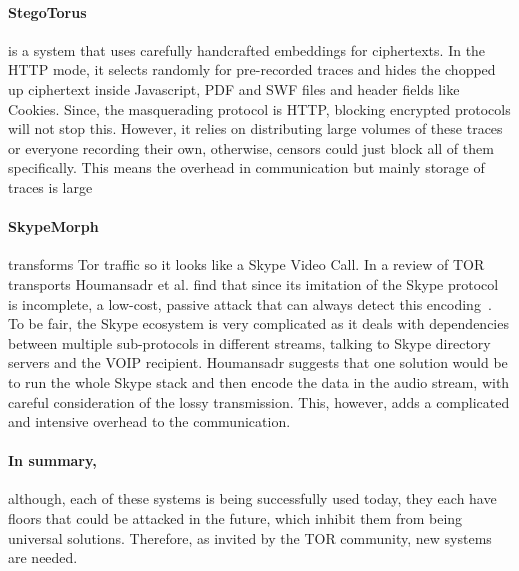 \documentclass[ %
                    author={Samuel Russell},
                supervisor={Prof. Bogdan Warinschi},
                    degree={MEng},
                     title={Innocuous Ciphertexts},
                  subtitle={The DE-CENSOR Scheme},
                      type={Research},
                      year={2018} ]{dissertation}
\begin{document}
\paragraph{StegoTorus} is a system that uses carefully handcrafted embeddings for ciphertexts. In the HTTP mode, it selects randomly for pre-recorded traces and hides the chopped up ciphertext inside Javascript, PDF and SWF files and header fields like Cookies. Since, the masquerading protocol is HTTP, blocking encrypted protocols will not stop this. However, it relies on distributing large volumes of these traces or everyone recording their own, otherwise, censors could just block all of them specifically. This means the overhead in communication but mainly storage of traces is large

\paragraph{SkypeMorph} transforms Tor traffic so it looks like a Skype Video Call.
In a review of TOR transports Houmansadr et al. find that since its imitation of the Skype protocol is incomplete, a low-cost, passive attack that can always detect this encoding~\cite{parot}.
To be fair, the Skype ecosystem is very complicated as it deals with dependencies between multiple sub-protocols in different streams, talking to Skype directory servers and the VOIP recipient. Houmansadr suggests that one solution would be to run the whole Skype stack and then encode the data in the audio stream, with careful consideration of the lossy transmission. This, however, adds a complicated and intensive overhead to the communication.

\paragraph{In summary,} although, each of these systems is being successfully used today, they each have floors that could be attacked in the future, which inhibit them from being universal solutions. Therefore, as invited by the TOR community, new systems are needed.

%
%
\end{document}
